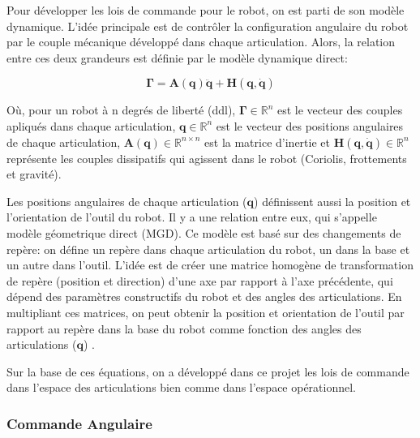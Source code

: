 \newcommand{\Epsilon}{E}

\label{Comm_Ang_e_Cart}
Pour développer les lois de commande pour le robot, on est parti de son modèle dynamique. L'idée principale est de contrôler la configuration angulaire du robot par le couple mécanique développé dans chaque articulation. Alors, la relation entre ces deux grandeurs est définie par le modèle dynamique direct:

	\begin{equation}
		\bm{\Gamma} = \bm{A}(\bm{q})\ddot{\bm{q}}+\bm{H}(\bm{q},\dot{\bm{q}})
		\label{MDD}
	\end{equation}

Où, pour un robot à n degrés de liberté (ddl), $ \bm{\Gamma} \in \mathbb{R}^n$ est le vecteur des couples apliqués dans chaque articulation, $\bm{q} \in \mathbb{R}^n$ est le vecteur des positions angulaires de chaque articulation, $ \bm{A}(\bm{q}) \in \mathbb{R}^{n \times n}$ est la matrice d'inertie et $ \bm{H}(\bm{q},\dot{\bm{q}})  \in \mathbb{R}^n$ représente les couples dissipatifs qui agissent dans le robot (Coriolis, frottements et gravité).

Les positions angulaires de chaque articulation ($\bm{q}$) définissent aussi la position et l'orientation de l'outil du robot. Il y a une relation entre eux, qui s'appelle modèle géometrique direct (MGD). Ce modèle est basé sur des changements de repère: on défine un repère dans chaque articulation du robot, un dans la base et un autre dans l'outil. L'idée est de créer une matrice homogène de transformation de repère (position et direction) d'une axe par rapport à l'axe précédente, qui dépend des paramètres constructifs du robot et des angles des articulations. En multipliant ces matrices, on peut obtenir la position et orientation de l'outil par rapport au repère dans la base du robot comme fonction des angles des articulations ($\bm{q}$) \cite{khalil2004modeling}.

Sur la base de ces équations, on a développé dans ce projet les lois de commande dans l'espace des articulations bien comme dans l'espace opérationnel.

\subsubsection{Commande Angulaire}\label{Comm_Ang}


